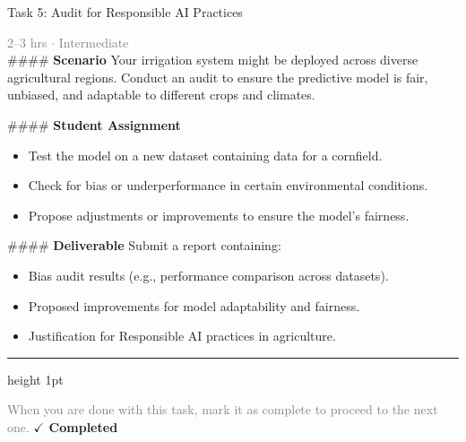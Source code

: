 \documentclass[10pt,a4paper]{article}
\begin{document}
\begin{taskbox}{Task 5: Audit for Responsible AI Practices}

    {\small \textcolor{gray}{2--3 hrs $\cdot$ Intermediate}}\\[12pt]

    \#\#\#\# \textbf{Scenario}  
Your irrigation system might be deployed across diverse agricultural regions. Conduct an audit to ensure the predictive model is fair, unbiased, and adaptable to different crops and climates.

\#\#\#\# \textbf{Student Assignment}  
\begin{itemize}
    \item Test the model on a new dataset containing data for a cornfield.
    \item Check for bias or underperformance in certain environmental conditions.
    \item Propose adjustments or improvements to ensure the model’s fairness.
\end{itemize}

\#\#\#\# \textbf{Deliverable}  
Submit a report containing:
\begin{itemize}
    \item Bias audit results (e.g., performance comparison across datasets).
    \item Proposed improvements for model adaptability and fairness.
    \item Justification for Responsible AI practices in agriculture.\par
\end{itemize}

    \vspace{16pt}

    \textcolor{cardBorder}{\hrule height 1pt}\vspace{8pt}

    \small \textcolor{gray}{When you are done with this task, mark it as complete to proceed to the next one.} \hfill \textbf{\textcolor{brandDark}{$\checkmark$ Completed}}

\end{taskbox}
\end{document}
